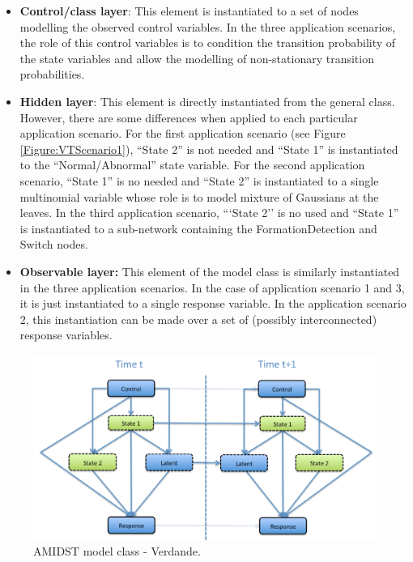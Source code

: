 \begin{itemize}
\item \textbf{Control/class layer}:  This element is instantiated to a set of nodes modelling the observed control variables. In the three application scenarios, the role of this control variables is to condition the transition probability of the state variables and allow the modelling of non-stationary transition probabilities.  

\item \textbf{Hidden layer}: This element is directly instantiated from the general class. However, there are some differences when applied to each particular application scenario. For the first application scenario (see Figure \ref{Figure:VTScenario1}),  ``State 2'' is not needed and ``State 1'' is instantiated to the ``Normal/Abnormal'' state variable. For the second application scenario, ``State 1'' is no needed and ``State 2'' is instantiated to a single multinomial variable whose role is to model mixture of Gaussians at the leaves. In the third application scenario, ```State 2'' is no used and ``State 1'' is instantiated to a sub-network containing the FormationDetection and Switch nodes. 

\item \textbf{Observable layer: } This element of the model class is similarly instantiated in the three application scenarios. In the case of application scenario 1 and 3, it is just instantiated to a single response variable. In the application scenario 2, this instantiation can be made over a set of (possibly interconnected) response variables. 
\end{itemize}



\begin{figure}[ht!]
\begin{center}
\includegraphics[scale=0.39]{./figures/AMIDSTModelClassVerdande}
\caption{\label{Figure:AMIDSTModelClassVerdande} AMIDST model class - Verdande.}
\end{center}
\end{figure}


